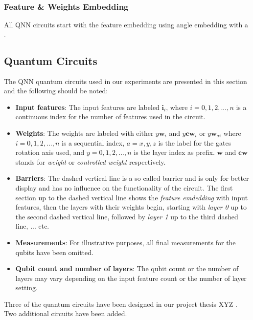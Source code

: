 \subsubsection{Feature \& Weights Embedding}
All QNN circuits start with the feature embedding using angle embedding  with a \rygate. 

\subsection{Quantum Circuits}
\label{subsection:qnn_quantum_circuits}
The QNN quantum circuits used in our experiments are presented in this section and the following should be noted:

\begin{itemize}
  \item \textbf{Input features}: The input features are labeled $\mathbf{i}_i$, where $i = 0,1,2,...,n$ is a continuous index for the number of features used in the circuit.
  \item \textbf{Weights}: The weights are labeled with either $y\mathbf{w}_i$ and $y\mathbf{cw}_i$ or $y\mathbf{w}_{ai}$ where $i = 0,1,2,...,n$ is a sequential index, $a = x,y,z$ is the label for the gates rotation axis used, and $y = 0,1,2,...,n$ is the layer index as prefix. $\mathbf{w}$ and $\mathbf{cw}$ stands for \textit{weight} or \textit{controlled weight} respectively.
  \item \textbf{Barriers}: The dashed vertical line is a so called barrier and is only for better display and has no influence on the functionality of the circuit. The first section up to the dashed vertical line shows the \textit{feature emdedding} with input features, then the layers with their weights begin, starting with \textit{layer 0} up to the second dashed vertical line, followed by \textit{layer 1} up to the third dashed line, ... etc.
  \item \textbf{Measurements}: For illustrative purposes, all final measurements for the qubits have been omitted.
  \item \textbf{Qubit count and number of layers}: The qubit count or the number of layers may vary depending on the input feature count or the number of layer setting.
\end{itemize}

Three of the quantum circuits have been designed in our project thesis XYZ . Two additional circuits have been added.


